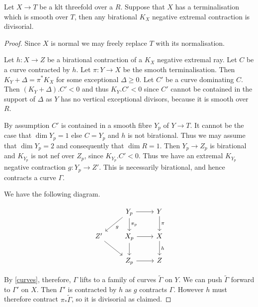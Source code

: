 \documentclass[a4paper,12pt]{amsart}
\begin{document}
	\begin{lemma}\label{lifting}
		
		Let $X \to T$ be a klt threefold over a $R$. Suppose that $X$ has a terminalisation which is smooth over $T$, then any birational $K_{X}$ negative extremal contraction is divisorial.
		
	\end{lemma}
	
	\begin{proof}
		
		Since $X$ is normal we may freely replace $T$ with its normalisation.
		
		Let $h:X \to Z$ be a birational contraction of a $K_{X}$ negative extremal ray. Let $C$ be a curve contracted by $h$. Let $\pi:Y \to X$ be the smooth terminalisation. Then $K_{Y}+\Delta=\pi^{*}K_{X}$ for some exceptional $\Delta \geq 0$. Let $C'$ be a curve dominating $C$. Then $(K_{Y}+\Delta).C' <0$ and thus $K_{Y}.C' < 0$ since $C'$ cannot be contained in the support of $\Delta$ as $Y$ has no vertical exceptional divisors, because it is smooth over $R$.
		
		By assumption $C'$ is contained in a smooth fibre $Y_{p}$ of $Y \to T$. It cannot be the case that $\dim Y_{p}=1$ else $C=Y_{p}$ and $h$ is not birational. Thus we may assume that $\dim Y_{p}=2$ and consequently that $\dim R=1$. Then $Y_{p} \to Z_{p}$ is birational and $K_{Y_{p}}$ is not nef over $Z_{p}$, since $K_{Y_{p}}.C' < 0$. Thus we have an extremal $K_{Y_{p}}$ negative contraction $g:Y_{p} \to Z'$. This is necessarily birational, and hence contracts a curve $\Gamma$.
		
		We have the following diagram.
		
		\[\begin{tikzcd}
		& Y_{p} \arrow[ld, "g"] \arrow[r]  \arrow[d, "\pi_{p}"]& Y \arrow[d, "\pi"] \\
		Z' \arrow[rd]         & X_{p} \arrow[r] \arrow[d]         & X \arrow[d, "h"]   \\
		& Z_{p} \arrow[r]                & Z                 
		\end{tikzcd}\]
		
		
		By \autoref{curves}, therefore, $\Gamma$ lifts to a family of curves $\tilde{\Gamma}$ on $Y$. We can push $\tilde{\Gamma}$ forward to $\Gamma'$ on $X$. Then $\Gamma'$ is contracted by $h$ as $g$ contracts $\Gamma$. However $h$ must therefore contract $\pi_{*}\tilde{\Gamma}$, so it is divisorial as claimed. 		
	\end{proof}
\end{document}
